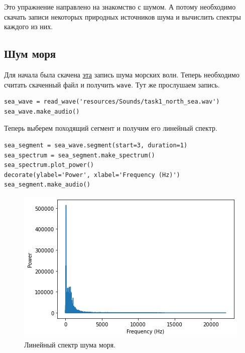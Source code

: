 \documentclass[a4paper, 14pt]{extarticle}
\begin{document}
    Это упражнение направлено на знакомство с шумом. А потому необходимо скачать записи некоторых природных источников
    шума и вычислить спектры каждого из них.

    \subsection{Шум моря}
    \label{subsec:task1_sea}

    Для начала была скачена \href{https://freesound.org/people/Soarer/sounds/13793/}{эта} запись шума морских волн.
    Теперь необходимо считать скаченный файл и получить \texttt{wave}. Тут же прослушаем запись.

    \begin{lstlisting}[caption= Чтение скаченного файла., label={lst:task1_read_sea}]
sea_wave = read_wave('resources/Sounds/task1_north_sea.wav')
sea_wave.make_audio()   \end{lstlisting}

    Теперь выберем походящий сегмент и получим его линейный спектр.

    \begin{lstlisting}[caption= Выбор сегмента и получение его линейного спектра., label={lst:task1_sea_spectrum_lin}]
sea_segment = sea_wave.segment(start=3, duration=1)
sea_spectrum = sea_segment.make_spectrum()
sea_spectrum.plot_power()
decorate(ylabel='Power', xlabel='Frequency (Hz)')
sea_segment.make_audio()    \end{lstlisting}

    \begin{figure}[h]
        \centering
        \includegraphics[width=0.8\linewidth]{resources/Images/task1_sea_spectrum_lin}
        \caption{Линейный спектр шума моря.}
        \label{fig:task1_sea_spectrum_lin}  \end{figure}
\end{document}
